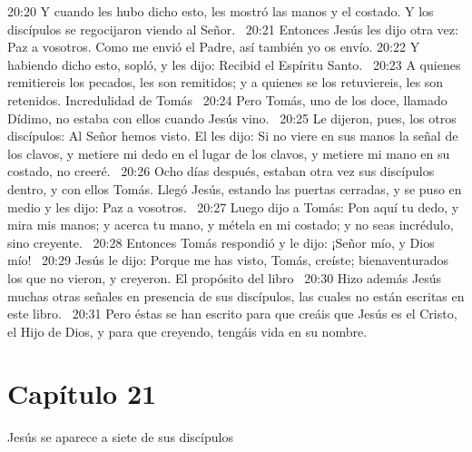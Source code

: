 20:20 Y cuando les hubo dicho esto, les mostró las manos y el costado. Y los discípulos se regocijaron viendo al Señor.  
20:21 Entonces Jesús les dijo otra vez: Paz a vosotros. Como me envió el Padre, así también yo os envío. 
20:22 Y habiendo dicho esto, sopló, y les dijo: Recibid el Espíritu Santo.  
20:23 A quienes remitiereis los pecados, les son remitidos; y a quienes se los retuviereis, les son retenidos. 
Incredulidad de Tomás  
20:24 Pero Tomás, uno de los doce, llamado Dídimo, no estaba con ellos cuando Jesús vino.  
20:25 Le dijeron, pues, los otros discípulos: Al Señor hemos visto. El les dijo: Si no viere en sus manos la señal de los clavos, y metiere mi dedo en el lugar de los clavos, y metiere mi mano en su costado, no creeré.  
20:26 Ocho días después, estaban otra vez sus discípulos dentro, y con ellos Tomás. Llegó Jesús, estando las puertas cerradas, y se puso en medio y les dijo: Paz a vosotros.  
20:27 Luego dijo a Tomás: Pon aquí tu dedo, y mira mis manos; y acerca tu mano, y métela en mi costado; y no seas incrédulo, sino creyente.  
20:28 Entonces Tomás respondió y le dijo: ¡Señor mío, y Dios mío!  
20:29 Jesús le dijo: Porque me has visto, Tomás, creíste; bienaventurados los que no vieron, y creyeron. 
El propósito del libro  
20:30 Hizo además Jesús muchas otras señales en presencia de sus discípulos, las cuales no están escritas en este libro.  
20:31 Pero éstas se han escrito para que creáis que Jesús es el Cristo, el Hijo de Dios, y para que creyendo, tengáis vida en su nombre.  
\section*{Capítulo 21}
Jesús se aparece a siete de sus discípulos  

